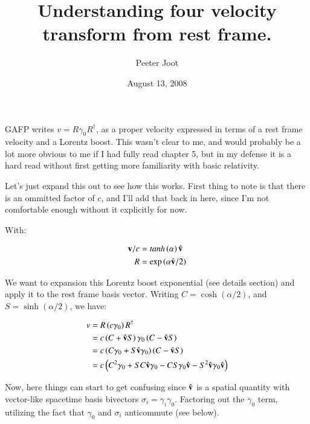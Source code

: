 \documentclass{article}      %
\title{Understanding four velocity transform from rest frame.}
\author{Peeter Joot}
\date{August 13, 2008}
\begin{document}

\maketitle{}

\section{}

GAFP writes $v = R \gamma_0 R^\dagger$, as a proper velocity expressed in terms of a rest frame velocity and a Lorentz boost.
This wasn't clear to me, and would probably be a lot more
obvious to me if I had fully read chapter 5, but in my defense it is a hard read without first getting
more familiarity with basic relativity.

Let's just expand this out
to see how this works.  First thing to note is that there is an ommitted factor
of $c$, and I'll add that back in here, since I'm not comfortable enough
without it explicitly for now.

With:

\begin{align*}
\mathbf{v}/c &= tanh\left(\alpha\right)\hat{\mathbf{v}} \\
R &= \exp\left(\alpha \hat{\mathbf{v}}/2\right)
\end{align*}

We want to expansion this Lorentz boost exponential (see details section) and apply it to the rest frame basis vector.  Writing
$C = \cosh\left(\alpha/2\right)$, and $S = \sinh\left(\alpha/2\right)$, we have:

\begin{align*}
v
&= R \left(c \gamma_0\right) R^\dagger \\
&= c \left(C + \hat{\mathbf{v}} S\right) \gamma_0 \left(C - \hat{\mathbf{v}} S\right) \\
&= c \left(C \gamma_0 + S \hat{\mathbf{v}} \gamma_0\right) \left(C - \hat{\mathbf{v}} S\right) \\
&= c \left( C^2 \gamma_0 + SC \hat{\mathbf{v}} \gamma_0 -CS \gamma_0\hat{\mathbf{v}} - S^2 \hat{\mathbf{v}} \gamma_0 \hat{\mathbf{v}} \right) \\
\end{align*}

Now, here things can start to get confusing since $\hat{\mathbf{v}}$ is a spatial quantity with vector-like spacetime basis bivectors $\sigma_i = \gamma_i \gamma_0$.  Factoring out the $\gamma_0$ term, utilizing the fact that $\gamma_0$ and $\sigma_i$ anticommute (see below).
\end{document}
